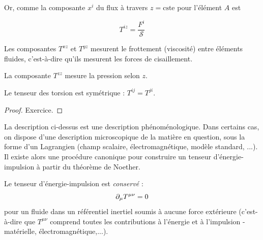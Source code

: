 Or, comme la composante $x^{i}$ du flux à travers $z = \text{cste}$ pour l'élément $A$ est 

\begin{equation}
    T^{iz} = \frac{F^{i}}{\mathcal{S}}
\end{equation}

\begin{theoremframe}
    \begin{defi}
        Les composantes $T^{xz}$ et $T^{yz}$ mesurent le frottement (viscosité) entre éléments fluides, c'est-à-dire qu'ils mesurent les forces de cisaillement. 

        La composante $T^{zz}$ mesure la pression selon $z$. 
    \end{defi}
\end{theoremframe}
\begin{theoremframe}
    \begin{propri}
        Le tenseur des torsion est symétrique : $T^{ij} = T^{ji}$.
    \end{propri}
\end{theoremframe}
\begin{proof}
    Exercice.
\end{proof}
\begin{rmk}
    La description ci-dessus est une description phénoménologique. Dans certains cas, on dispose d'une description microscopique de la matière en question, sous la forme d'un Lagrangien (champ scalaire, électromagnétique, modèle standard, ...). Il existe alors une procédure canonique pour construire un tenseur d'énergie-impulsion à partir du théorème de Noether.
\end{rmk}
\begin{theoremframe}
    \begin{propri}
        Le tenseur d'énergie-impulsion est \emph{conservé} :
        \begin{equation}
            \partial_\mu T^{\mu\nu} = 0
        \end{equation}
        pour un fluide dans un référentiel inertiel soumis à aucune force extérieure (c'est-à-dire que $T^{\mu \nu}$ comprend toutes les contributions à l'énergie et à l'impulsion - matérielle, électromagnétique,...).
    \end{propri}
\end{theoremframe}
